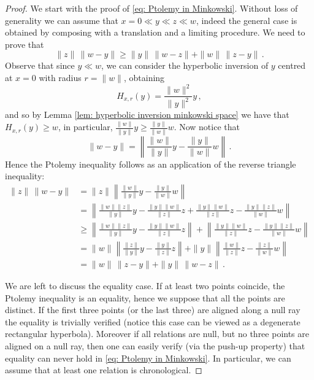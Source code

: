 \documentclass[hidelinks,12pt,a4paper]{article}
\numberwithin{equation}{section}
\theoremstyle{plain}
\theoremstyle{definition}
\begin{document}
\begin{proof}
We start with the proof of \eqref{eq: Ptolemy in Minkowski}. Without loss of generality we can assume that $x=0 \ll y \ll z \ll w$, indeed the general case is obtained by composing with a translation and a limiting procedure. 
We need to prove that
\[
\| z \| \, \| w- y \| \geq \| y \| \, \| w-z \| + \| w \| \,  \| z-y \| \, .
\]
Observe that since $y \ll w$, we can consider the hyperbolic inversion of $y$ centred at $x=0$ with radius $r= \|w\|$, obtaining 
\[
H_{x,r} (y) = \frac{\|w\|^2}{\|y\|^2} y \, ,
\]
and so by Lemma \ref{lem: hyperbolic inversion minkowski space} we have that $H_{x,r} (y) \geq w$, in particular, $\frac{\| w \|}{\|y\|} y \geq \frac{\|y\|}{\|w\|} w$. 
Now notice that
\[
\| w -y \| = \left \|   \frac{\| w \|}{\|y\|} y - \frac{\|y\|}{\|w\|} w \right \| \, .
\]
Hence the Ptolemy inequality follows as an application of the reverse triangle inequality:
\begin{align*}
\|z\| \, \| w-y \| & = \| z \|  \left \|   \frac{\| w \|}{\|y\|} y - \frac{\|y\|}{\|w\|} w \right \| \\
& = \left \| \frac{\|w \| \| z\|}{\|y \| } y - \frac{\|y\| \|w\|}{\|z\|} z + \frac{\|y\| \|w\|}{\|z\|} z - \frac{\|y\| \| z\|}{\|w\|} w \right \| \\
& \geq \left \| \frac{\|w \| \| z\|}{\|y \| } y - \frac{\|y\| \|w\|}{\|z\|} z \right \| + \left \| \frac{\|y\| \|w\|}{\|z\|} z - \frac{\|y\| \| z\|}{\|w\|} w \right \| \\
& =\| w\| \left \| \frac{\| z\|}{\|y \| } y - \frac{\|y\|}{\|z\|} z \right \| + \| y\|  \left \| \frac{\| w\|}{\|z \| } z - \frac{\|z\|}{\|w\|} w \right \| \\
& = \| w \| \,  \| z-y \| + \| y \| \, \| w-z \| \, .
\end{align*} 

We are left to discuss the equality case. 
If at least two points coincide, the Ptolemy inequality is an equality, hence we suppose that all the points are distinct. 
If the first three points (or the last three) are aligned along a null ray the equality is trivially verified (notice this case can be viewed as a degenerate rectangular hyperbola). Moreover if all relations are null, but no three points are aligned on a null ray, then one can easily verify (via the push-up property) that equality can never hold in \eqref{eq: Ptolemy in Minkowski}. In particular, we can assume that at least one relation is chronological.


\end{proof}
\end{document}
